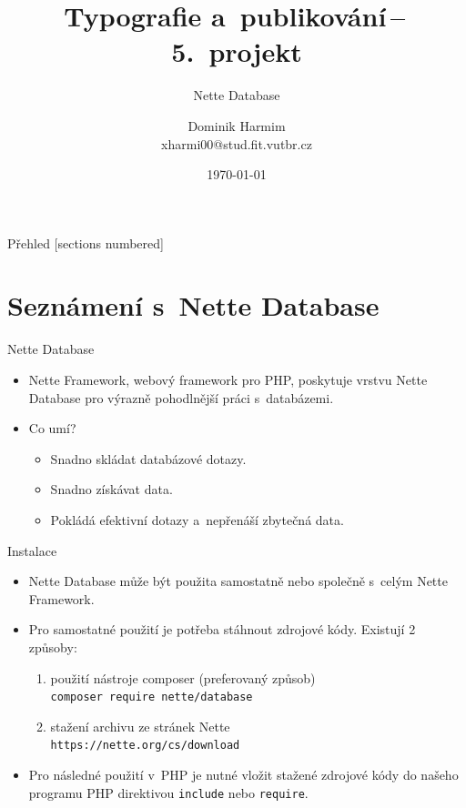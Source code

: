 \documentclass[10pt, hyperref={unicode}]{beamer}
\title{Typografie a~publikování\,--\,5.~projekt}
\subtitle{Nette Database}
\author{Dominik Harmim\texorpdfstring{\\ xharmi00@stud.fit.vutbr.cz}{}}
\date{\today}
\institute
{
	Vysoké učení technické v~Brně\\
	Fakulta informačních technologií
}
\begin{document}
\maketitle



\begin{frame}{Přehled}
	[sections numbered]
	\tableofcontents[hideallsubsections]
\end{frame}




\section{Seznámení s~Nette Database}

\begin{frame}{Nette Database}
	\begin{itemize}
		\item
			Nette Framework, webový framework pro PHP, poskytuje vrstvu \alert{Nette Database} pro
			výrazně pohodlnější práci s~databázemi.

		\item
			Co umí?
			\begin{itemize}
				\item Snadno skládat databázové dotazy.
				\item Snadno získávat data.
				\item Pokládá efektivní dotazy a~nepřenáší zbytečná data.
			\end{itemize}
	\end{itemize}
\end{frame}



\begin{frame}{Instalace}
	\begin{itemize}
		\item
			\alert{Nette Database} může být použita samostatně nebo společně s~celým Nette Framework.

		\item
			Pro samostatné použití je potřeba stáhnout zdrojové kódy. Existují 2 způsoby:
			\begin{enumerate}
				\item použití nástroje \alert{composer} (preferovaný způsob) \\
					\texttt{composer require nette/database}
				\item stažení archivu ze stránek Nette \\
					\texttt{https://nette.org/cs/download}
			\end{enumerate}

		\item
			Pro následné použití v~PHP je nutné vložit stažené zdrojové kódy do našeho programu
			PHP direktivou \texttt{include} nebo \texttt{require}.
	\end{itemize}
\end{frame}
\end{document}
